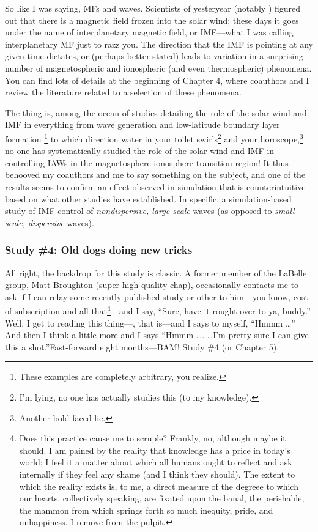 So like I was saying, MFs and waves. Scientists of yesteryear (notably
\citet{Parker1958}) figured out that there is a magnetic field frozen into the
solar wind; these days it goes under the name of interplanetary magnetic field,
or IMF---what I was calling interplanetary MF just to razz you. The direction
that the IMF is pointing at any given time dictates, or (perhaps better stated)
leads to variation in a surprising number of magnetospheric and ionospheric (and
even thermospheric) phenomena. You can find lots of details at the beginning of
Chapter 4, where coauthors and I review the literature related to a selection of
these phenomena.

The thing is, among the ocean of studies detailing the role of the solar wind
and IMF in everything from wave generation \citep[][for
example]{Claudepierre2008} and low-latitude boundary layer formation
\citep{Song2003a}\footnote{These examples are completely arbitrary, you
  realize.}  to which direction water in your toilet swirls\footnote{I'm lying,
  no one has actually studies this (to my knowledge).} and your
horoscope,\footnote{Another bold-faced lie.} no one has systematically studied
the role of the solar wind and IMF in controlling IAWs in the
magnetosphere-ionosphere transition region!  It thus behooved my coauthors and
me to say something on the subject, and one of the results seems to confirm an
effect observed in simulation that is counterintuitive based on what other
studies have established. In specific, a simulation-based study of IMF control
of \emph{nondispersive, large-scale} \Alf waves (as opposed to
\emph{small-scale, dispersive} \Alf waves).

\subsubsection{Study \#4: Old dogs doing new tricks}

All right, the backdrop for this study is classic. A former member of the
LaBelle group, Matt Broughton (super high-quality chap), occasionally contacts
me to ask if I can relay some recently published study or other to him---you
know, cost of subscription and all that\footnote{Does this practice cause me to
  scruple? Frankly, no, although maybe it should. I am pained by the reality
  that knowledge has a price in today's world; I feel it a matter about which
  all humans ought to reflect and ask internally if they feel any shame (and I
  think they should). The extent to which the reality exists is, to me, a direct
  measure of the degreee to which our hearts, collectively speaking, are fixated
  upon the banal, the perishable, the mammon from which springs forth so much
  inequity, pride, and unhappiness. I remove from the pulpit.}---and I say,
``Sure, have it rought over to ya, buddy.'' Well, I get to reading this
thing---\citet{Bellan2016}, that is---and I says to myself, ``Hmmm \dots'' And
then I think a little more and I says ``Hmmm \dots . \dots I'm pretty sure I can
give this a shot.''Fast-forward eight months---BAM! Study \#4 (or Chapter 5).

